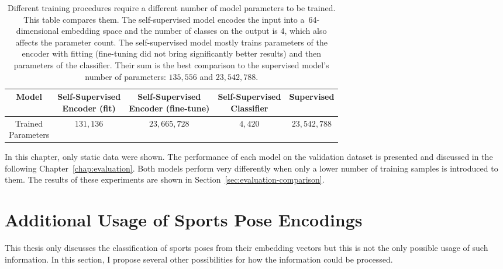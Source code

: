 \begin{table}[!ht]
    \begin{center}
        \begin{tabular}{ |c||c|c|c|c| }
            \hline
                Model & \makecell{Self-Supervised \\ Encoder (fit)} & \makecell{Self-Supervised \\ Encoder (fine-tune)} & \makecell{Self-Supervised \\ Classifier} & Supervised \\
            \hline
            \hline
                \makecell{Trained \\ Parameters} & $131{,}136$ & $23{,}665{,}728$ & $4{,}420$ & $23{,}542{,}788$ \\
            \hline
        \end{tabular}
    \end{center}
    \caption{Different training procedures require a different number of model parameters to be trained. This table compares them. The self-supervised model encodes the input into a~64-dimensional embedding space and the number of classes on the output is 4, which also affects the parameter count. The self-supervised model mostly trains parameters of the encoder with fitting (fine-tuning did not bring significantly better results) and then parameters of the classifier. Their sum is the best comparison to the supervised model's number of parameters: $135{,}556$ and $23{,}542{,}788$.}
    \label{tab:selfsupervised-vs-supervised-params}
\end{table}

In this chapter, only static data were shown. The performance of each model on the validation dataset is presented and discussed in the following Chapter~\ref{chap:evaluation}. Both models perform very differently when only a lower number of training samples is introduced to them. The results of these experiments are shown in Section~\ref{sec:evaluation-comparison}.

\section{\label{sec:additional-usage}Additional Usage of Sports Pose Encodings}

This thesis only discusses the classification of sports poses from their embedding vectors but this is not the only possible usage of such information. In this section, I propose several other possibilities for how the information could be processed.

